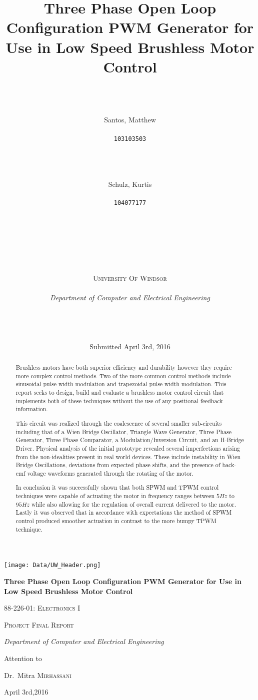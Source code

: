 \documentclass[12pt]{article}
\title{\huge\bfseries Three Phase Open Loop Configuration PWM Generator for Use in Low Speed Brushless Motor Control
}
\author{
  \\
  \\
  \\
  \huge Santos, Matthew\\
  \\
  \texttt{\huge 103103503}
  \and
  \\
  \\
  \\
  \huge Schulz, Kurtis\\
  \\
  \texttt{\huge 104077177}
}
\date{\phantom\\
    \phantom\\
    \phantom\\
    \phantom\\
    \phantom\\
    \phantom\\
    {\scshape\Large University Of Windsor}\\
    \phantom\\
    {\Large\itshape Department of Computer and Electrical Engineering}\\
    \phantom\\
    \phantom\\
    \phantom\\
    \phantom\\
    Submitted April 3rd, 2016
}
\begin{document}
\begin{titlepage}
	\centering
	\texttt{[image: Data/UW\_Header.png]}\par\vspace{1cm}

	{\huge\bfseries Three Phase Open Loop Configuration PWM Generator for Use in Low Speed Brushless Motor Control\par}
	\vspace{1cm}
	{\scshape\Large 88-226-01: Electronics I\par}
	\vspace{1cm}
	{\scshape\Large Project Final Report \par}

	\vspace{2cm}
	{\Large\itshape Department of Computer and Electrical Engineering\par}
	\vfill
	Attention to\par
	Dr.~Mitra \textsc{Mirhassani}

	\vfill

	{\large April 3rd,2016\par}
\end{titlepage} %

\maketitle

\pagebreak
\tableofcontents
\pagebreak

\begin{abstract}

    Brushless motors have both superior efficiency and durability however they require more complex control methods. Two of the more common control methods include sinusoidal pulse width modulation and trapezoidal pulse width modulation. This report seeks to design, build and evaluate a brushless motor control circuit that implements both of these techniques without the use of any positional feedback information.
    
    This circuit was realized through the coalescence of several smaller sub-circuits including that of a Wien Bridge Oscillator, Triangle Wave Generator, Three Phase Generator, Three Phase Comparator, a Modulation/Inversion Circuit, and an H-Bridge Driver. Physical analysis of the initial prototype revealed several imperfections arising from the non-idealities present in real world devices. These include instability in Wien Bridge Oscillations, deviations from expected phase shifts, and the presence of back-emf voltage waveforms generated through the rotating of the motor.
    
    In conclusion it was successfully shown that both SPWM and TPWM control techniques were capable of actuating the motor in frequency ranges between $5Hz$ to $95Hz$ while also allowing for the regulation of overall current delivered to the motor. Lastly it was observed that in accordance with expectations the method of SPWM control produced smoother actuation in contrast to the more bumpy TPWM technique.
    
\end{abstract}
\end{document}
